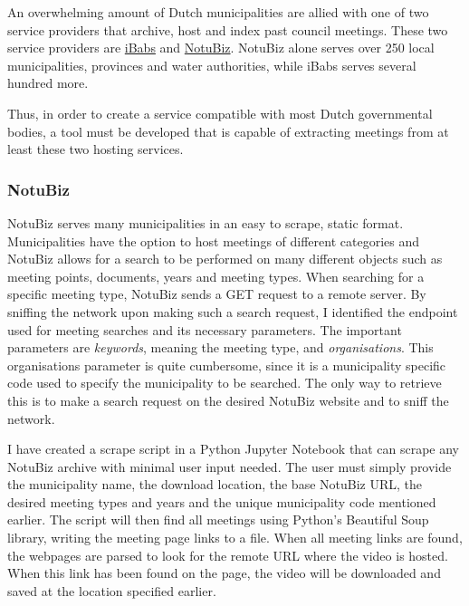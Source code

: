 \documentclass[twoside]{uva-inf-bachelor-thesis}
\begin{document}
An overwhelming amount of Dutch municipalities are allied with one of two service providers that archive, host and index past council meetings. These two service providers are \href{https://www.ibabs.com}{iBabs} and \href{https://www.notubiz.nl/}{NotuBiz}. NotuBiz alone serves over 250 local municipalities, provinces and water authorities, while iBabs serves several hundred more. 

Thus, in order to create a service compatible with most Dutch governmental bodies, a tool must be developed that is capable of extracting meetings from at least these two hosting services.

\subsubsection{NotuBiz}
NotuBiz serves many municipalities in an easy to scrape, static format. Municipalities have the option to host meetings of different categories and NotuBiz allows for a search to be performed on many different objects such as meeting points, documents, years and meeting types.
When searching for a specific meeting type, NotuBiz sends a GET request to a remote server. By sniffing the network upon making such a search request, I identified the endpoint used for meeting searches and its necessary parameters. 
The important parameters are \textit{keywords}, meaning the meeting type, and \textit{organisations}. 
This organisations parameter is quite cumbersome, since it is a municipality specific code used to specify the municipality to be searched. The only way to retrieve this is to make a search request on the desired NotuBiz website and to sniff the network. 

I have created a scrape script in a Python Jupyter Notebook that can scrape any NotuBiz archive with minimal user input needed. The user must simply provide the municipality name, the download location, the base NotuBiz URL, the desired meeting types and years and the unique municipality code mentioned earlier. 
The script will then find all meetings using Python's Beautiful Soup library, writing the meeting page links to a file. When all meeting links are found, the webpages are parsed to look for the remote URL where the video is hosted. When this link has been found on the page, the video will be downloaded and saved at the location specified earlier.
\end{document}
